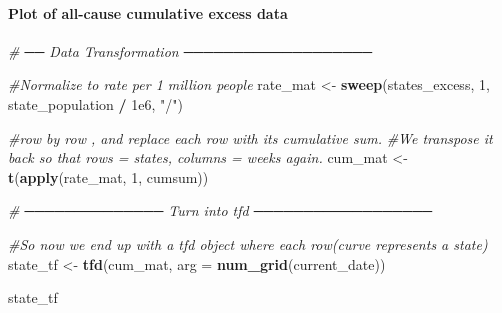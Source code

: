 \documentclass[
]{article}
\newenvironment{Shaded}{\begin{snugshade}}{\end{snugshade}}
\newcommand{\AttributeTok}[1]{\textcolor[rgb]{0.13,0.29,0.53}{#1}}
\newcommand{\CommentTok}[1]{\textcolor[rgb]{0.56,0.35,0.01}{\textit{#1}}}
\newcommand{\DecValTok}[1]{\textcolor[rgb]{0.00,0.00,0.81}{#1}}
\newcommand{\FloatTok}[1]{\textcolor[rgb]{0.00,0.00,0.81}{#1}}
\newcommand{\FunctionTok}[1]{\textcolor[rgb]{0.13,0.29,0.53}{\textbf{#1}}}
\newcommand{\NormalTok}[1]{#1}
\newcommand{\OtherTok}[1]{\textcolor[rgb]{0.56,0.35,0.01}{#1}}
\newcommand{\SpecialCharTok}[1]{\textcolor[rgb]{0.81,0.36,0.00}{\textbf{#1}}}
\newcommand{\StringTok}[1]{\textcolor[rgb]{0.31,0.60,0.02}{#1}}
\begin{document}
\paragraph{Plot of all-cause cumulative excess
data}\label{plot-of-all-cause-cumulative-excess-data}

\begin{Shaded}
\end{Shaded}

\begin{Shaded}
\begin{Highlighting}[]
\CommentTok{\# ── Data Transformation ───────────────────}

\CommentTok{\#Normalize to rate per 1 million people}
\NormalTok{rate\_mat }\OtherTok{\textless{}{-}} \FunctionTok{sweep}\NormalTok{(states\_excess, }\DecValTok{1}\NormalTok{, state\_population }\SpecialCharTok{/} \FloatTok{1e6}\NormalTok{, }\StringTok{"/"}\NormalTok{)}

\CommentTok{\#row by row , and replace each row with its cumulative sum.}
\CommentTok{\#We transpose it back so that rows = states, columns = weeks again.}
\NormalTok{cum\_mat  }\OtherTok{\textless{}{-}} \FunctionTok{t}\NormalTok{(}\FunctionTok{apply}\NormalTok{(rate\_mat, }\DecValTok{1}\NormalTok{, cumsum))}
\end{Highlighting}
\end{Shaded}

\begin{Shaded}
\begin{Highlighting}[]
\CommentTok{\# ────────────── Turn into tfd ──────────────────}

\CommentTok{\#So now we end up with a tfd object where each row(curve represents a state)}
\NormalTok{state\_tf }\OtherTok{\textless{}{-}} \FunctionTok{tfd}\NormalTok{(cum\_mat, }\AttributeTok{arg =} \FunctionTok{num\_grid}\NormalTok{(current\_date))}

\NormalTok{state\_tf}
\end{Highlighting}
\end{Shaded}
\end{document}

